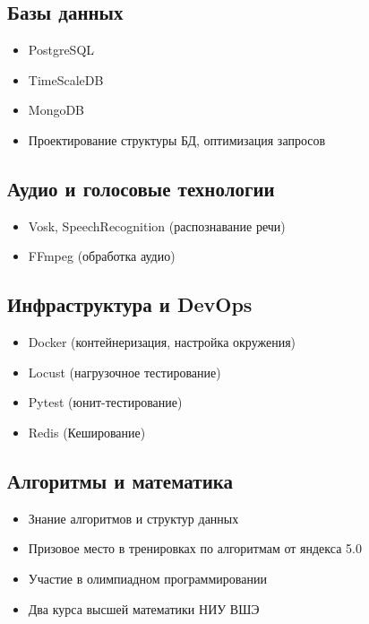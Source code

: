 \documentclass[a4paper,12pt]{article}
\begin{document}
	\subsection*{Базы данных}
	\begin{itemize}[leftmargin=1.5em]
		\item PostgreSQL
		\item TimeScaleDB
		\item MongoDB
		\item Проектирование структуры БД, оптимизация запросов
	\end{itemize}
	
	\subsection*{Аудио и голосовые технологии}
	\begin{itemize}[leftmargin=1.5em]
		\item Vosk, SpeechRecognition (распознавание речи)
		\item FFmpeg (обработка аудио)
	\end{itemize}
	
	\subsection*{Инфраструктура и DevOps}
	\begin{itemize}[leftmargin=1.5em]
		\item Docker (контейнеризация, настройка окружения)
		\item Locust (нагрузочное тестирование)
		\item Pytest (юнит-тестирование)
		\item Redis (Кеширование)
	\end{itemize}
	
	\subsection*{Алгоритмы и математика}
	\begin{itemize}[leftmargin=1.5em]
		\item Знание алгоритмов и структур данных
		\item Призовое место в тренировках по алгоритмам от яндекса 5.0
		\item Участие в олимпиадном программировании
		\item Два курса высшей математики НИУ ВШЭ
		
	\end{itemize}
	
\end{document}
